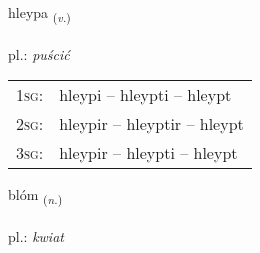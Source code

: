 \documentclass[frontgrid, backgrid]{flacards}\usepackage[]{graphicx}\usepackage[]{xcolor}
\begin{document}
\renewcommand{\blhead}{\vskip5pt {\small\bfseries\footnotesize Sagnorð | Verb }}
\renewcommand{\bcfoot}{\vskip5pt \hspace{2pt}{\small\bfseries\footnotesize 2K}}


{hleypa \small{\textsubscript{(\textit{v.})}} \\[1ex] %
\textphonetic{[l̥eiːpa]} \\
pl.: \emph{puścić} \\  [2ex]
\renewcommand*{\arraystretch}{0.8}
\begin{tabular}{p{1cm}l}
\textsc{1sg}: & hleypi -- hleypti -- hleypt \\ 
\textsc{2sg}: & hleypir -- hleyptir -- hleypt \\ 
\textsc{3sg}: & hleypir -- hleypti -- hleypt \\ 
\end{tabular}
}

\renewcommand{\flhead}{\vskip5pt \fboxsep=0pt {\small\bfseries\footnotesize Nafnorð | Noun}}
\renewcommand{\fcfoot}{\vskip5pt \fboxsep=0pt \hspace{2pt}{\small\bfseries\footnotesize 2K}}

\renewcommand{\blhead}{\vskip5pt {\small\bfseries\footnotesize Nafnorð | Noun }}
\renewcommand{\bcfoot}{\vskip5pt \hspace{2pt}{\small\bfseries\footnotesize 2K}}


{blóm \small{\textsubscript{(\textit{n.})}} \\[1ex] %
\textphonetic{[plouːm]} \\
pl.: \emph{kwiat} \\  [2ex]
\renewcommand*{\arraystretch}{0.8}
}

\renewcommand{\flhead}{\vskip5pt \fboxsep=0pt {\small\bfseries\footnotesize Sagnorð | Verb}}
\renewcommand{\fcfoot}{\vskip5pt \fboxsep=0pt \hspace{2pt}{\small\bfseries\footnotesize 2K}}
\end{document}

